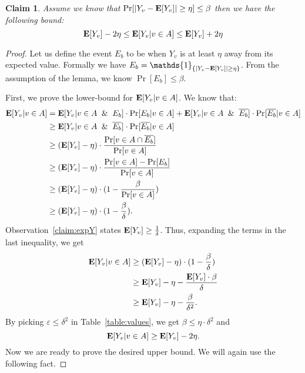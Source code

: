 \documentclass[letterpaper,11pt]{article}
\renewcommand{\epsilon}{\varepsilon}
\DeclareMathOperator{\E}{\ensuremath{\normalfont \textbf{E}}}
\renewcommand{\epsilon}[0]{\ensuremath{\varepsilon}}
\newtheorem{claim}[lemma]{Claim}
\begin{document}
\begin{claim}\label{claim:YVconditionAdiff}
    Assume we know that 
    $\Pr[|Y_v - \E[Y_v]| \geq \eta] \leq \beta$
    then we have the following bound:
    $$
    \E[Y_v] - 2 \eta \leq \E[Y_v | v \in A] \leq \E[Y_v] + 2\eta
    $$
    
\end{claim}

\newcommand{\NOT}[1]{\ensuremath{\mathrlap{#1}\phantom{#1}}}

\begin{proof}
    Let us define the event $E_b$ to be when $Y_v$ is at least $\eta$ away from its expected value. Formally we have $E_b = \mathds{1}_{ \{ |Y_v - \E[Y_v]| \geq \eta \} }$. From the assumption of the lemma, we know $\Pr[E_b] \leq \beta.$
    
    First, we prove the lower-bound for $\E[Y_v | v \in A]$. We know that:
    \begin{align*}
       \E[Y_v | v \in A] & = \E[Y_v | v \in A \And E_b] \cdot \Pr[E_b | v \in A] + \E[Y_v | v \in A \And \overline{E_b}] \cdot \Pr[\overline{E_b} | v \in A] \\ 
       & \geq  \E[Y_v | v \in A \And \overline{E_b}] \cdot \Pr[\overline{E_b} | v \in A] \\
       & \geq (\E[Y_v] - \eta) \cdot \frac{\Pr[v \in A \cap \overline{E_b}]}{\Pr[v \in A]} \\
       &\geq (\E[Y_v] - \eta) \cdot \frac{\Pr[v \in A] - \Pr[E_b]}{\Pr[v \in A]} \\
        &\geq (\E[Y_v] - \eta) \cdot (1 - \frac{\beta}{\Pr[v \in A]}) \\
        & \geq (\E[Y_v] - \eta) \cdot (1 - \frac{\beta}{\delta}). 
    \end{align*}
      Observation~\ref{claim:expY} states  $\E[Y_v] \geq \frac{1}{\delta}$. Thus, expanding the terms in the last inequality, we get
    \begin{align*}
       \E[Y_v | v \in A] & \geq (\E[Y_v] - \eta) \cdot (1 - \frac{\beta}{\delta}) \\
        & \geq \E[Y_v] - \eta - \frac{\E[Y_v] \cdot \beta}{\delta} \\
        & \geq \E[Y_v] - \eta - \frac{\beta}{\delta^2}.
    \end{align*}
    By picking  $\epsilon\leq \delta^2$ in Table~\ref{table:values}, we get  $\beta \leq \eta \cdot \delta^2$ and 
    $$\E[Y_v | v \in A] \geq \E[Y_v] - 2 \eta.$$
    Now we are ready to prove the desired upper bound. We will again  use the following fact.

\end{proof}
\end{document}
